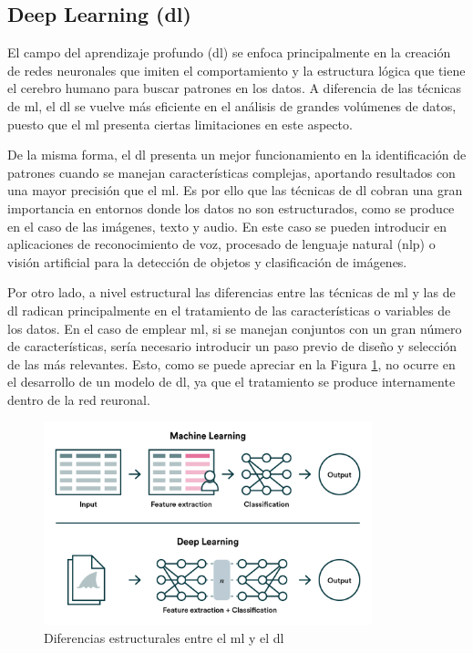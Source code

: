 \subsection{Deep Learning (\acrshort{dl})}
\label{sec:dl}

El campo del aprendizaje profundo (\acrfull{dl}) se enfoca principalmente en la creación de redes neuronales que imiten el comportamiento y la estructura lógica que tiene el cerebro humano para buscar patrones en los datos. A diferencia de las técnicas de \gls{ml}, el \gls{dl} se vuelve más eficiente en el análisis de grandes volúmenes de datos, puesto que el \gls{ml} presenta ciertas limitaciones en este aspecto. \cite{metal} 

\vspace{3mm}

De la misma forma, el \gls{dl} presenta un mejor funcionamiento en la identificación de patrones cuando se manejan características complejas, aportando resultados con una mayor precisión que el \gls{ml}. Es por ello que las técnicas de \gls{dl} cobran una gran importancia en entornos donde los datos no son estructurados, como se produce en el caso de las imágenes, texto y audio. En este caso se pueden introducir en aplicaciones de reconocimiento de voz, procesado de lenguaje natural (\gls{nlp}) o visión artificial para la detección de objetos y clasificación de imágenes. \cite{iageeks}

\vspace{3mm}

Por otro lado, a nivel estructural las diferencias entre las técnicas de \gls{ml} y las de \gls{dl} radican principalmente en el tratamiento de las características o variables de los datos. En el caso de emplear \gls{ml}, si se manejan conjuntos con un gran número de características, sería necesario introducir un paso previo de diseño y selección de las más relevantes. Esto, como se puede apreciar en la Figura \ref{fig:features}, no ocurre en el desarrollo de un modelo de \gls{dl}, ya que el tratamiento se produce internamente dentro de la red reuronal. \cite{valohai}

\vspace{3mm}

\begin{figure}[h!]
    \centering
    \includegraphics[width=0.85\textwidth]{img/teoria/mlvsdl.png}
    \caption{Diferencias estructurales entre el \acrshort{ml} y el \acrshort{dl} \cite{valohai}}
    \label{fig:features}
\end{figure}

